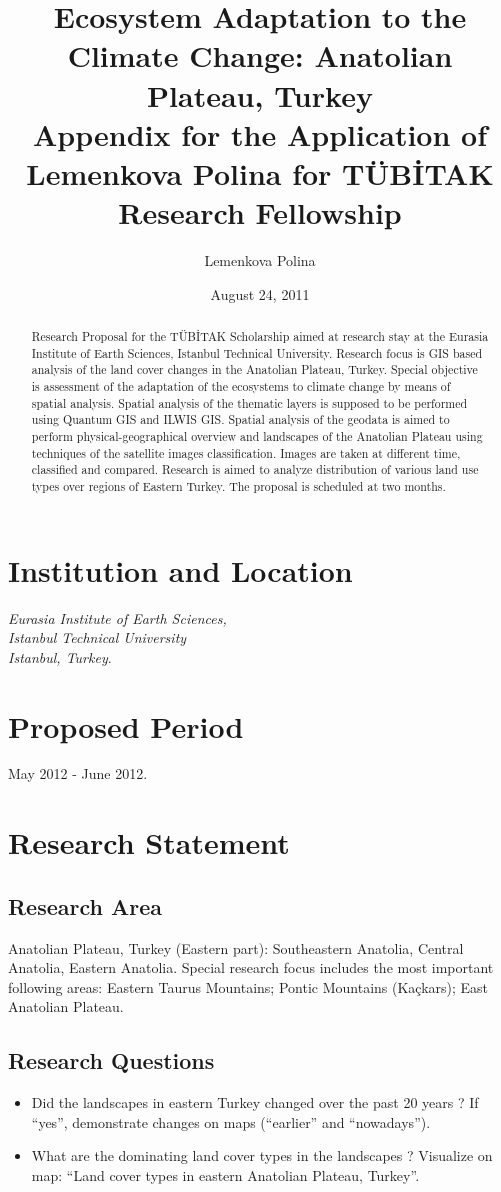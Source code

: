 \documentclass[10pt]{hitec}
\title{%
 Ecosystem Adaptation to the Climate Change: Anatolian Plateau, Turkey
 \\ \vspace{1em}
  \large Appendix for the Application of Lemenkova Polina for TÜBİTAK Research Fellowship}
\author{Lemenkova Polina}
\date{August 24, 2011}
\begin{document}
\maketitle

\begin{abstract}Research Proposal for the TÜBİTAK Scholarship aimed at research stay at the Eurasia Institute of Earth Sciences, Istanbul Technical University. Research focus is GIS based analysis of the land cover changes in the Anatolian Plateau, Turkey. Special objective is assessment of the adaptation of the ecosystems to climate change by means of spatial analysis. Spatial analysis of the thematic layers is supposed to be performed using Quantum GIS and ILWIS GIS. Spatial analysis of the geodata is aimed to perform physical-geographical overview and landscapes of the Anatolian Plateau using techniques of the satellite images classification. Images are taken at different time, classified and compared. Research is aimed to analyze distribution of various land use types over regions of Eastern Turkey. The proposal is scheduled at two months. 
\end{abstract}

\section{Institution and Location}
\emph{Eurasia Institute of Earth Sciences,\\
Istanbul Technical University\\
Istanbul, Turkey}.

\section{Proposed Period}
 May 2012 -  June 2012.

\section{Research Statement}

\subsection{Research Area}
Anatolian Plateau, Turkey (Eastern part): Southeastern Anatolia, Central Anatolia, Eastern Anatolia. Special research focus includes the most important  following areas: Eastern Taurus Mountains; Pontic Mountains (Kaçkars); East Anatolian Plateau.

\subsection{Research Questions}
\begin{itemize}
	\item Did the landscapes in eastern Turkey changed over the past 20 years ? If “yes”, demonstrate changes on maps (“earlier” and “nowadays”).
	\item What are the dominating land cover types in the landscapes ?
Visualize on map: “Land cover types in eastern Anatolian Plateau, Turkey”.
\end{itemize}
\end{document}
